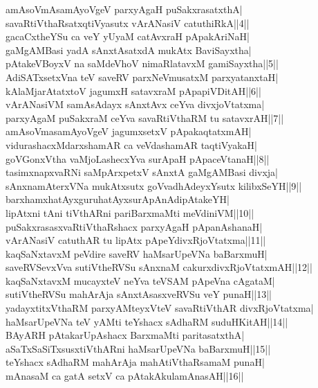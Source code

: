 \documentclass{article}
\begin{document}
amAsoVmAsamAyoVgeV parxyAgaH puSakxrasatxthA|\\
savaRtiVthaRsatxqtiVyasutx vArANasiV catuthiRkA||4||\\
gacaCxtheYSu ca veY yUyaM catAvxraH pApakAriNaH|\\
gaMgAMBasi yadA sAnxtAsatxdA mukAtx BaviSayxtha|\\
pAtakeVBoyxV na saMdeVhoV nimaRlatavxM gamiSayxtha||5||\\
AdiSATxsetxVna teV saveRV parxNeVmusatxM parxyatanxtaH|\\
kAlaMjarAtatxtoV jagumxH satavxraM pApapiVDitAH||6||\\
vArANasiVM samAsAdayx sAnxtAvx ceYva divxjoVtatxma|\\
parxyAgaM puSakxraM ceYva savaRtiVthaRM tu satavxrAH||7||\\
amAsoVmasamAyoVgeV jagumxsetxV pApakaqtatxmAH|\\
vidurashacxMdarxshamAR ca veVdashamAR taqtiVyakaH|\\
goVGonxVtha vaMjoLashecxYva surApaH pApaceVtanaH||8||\\
tasimxnapxvaRNi saMpArxpetxV sAnxtA gaMgAMBasi divxja|\\
sAnxnamAterxVNa mukAtxsutx goVvadhAdeyxYsutx kilibxSeYH||9||\\
barxhamxhatAyxguruhatAyxsurApAnAdipAtakeYH|\\
lipAtxni tAni tiVthARni pariBarxmaMti meVdiniVM||10||\\
puSakxrasasxvaRtiVthaRshacx parxyAgaH pApanAshanaH|\\
vArANasiV catuthAR tu lipAtx pApeYdivxRjoVtatxma||11||\\
kaqSaNxtavxM peVdire saveRV haMsarUpeVNa baBarxmuH|\\
saveRVSevxVva sutiVtheRVSu sAnxnaM cakurxdivxRjoVtatxmAH||12||\\
kaqSaNxtavxM mucayxteV neYva teVSAM pApeVna cAgataM|\\
sutiVtheRVSu mahArAja sAnxtAsasxveRVSu veY punaH||13||\\
yadayxtitxVthaRM parxyAMteyxVteV savaRtiVthAR divxRjoVtatxma|\\
haMsarUpeVNa teV yAMti teYshacx sAdhaRM suduHKitAH||14||\\
BAyARH pAtakarUpAshacx BarxmaMti paritasatxthA|\\
aSaTxSaSiTxsusxtiVthARni haMsarUpeVNa baBarxmuH||15||\\
teYshacx sAdhaRM mahArAja mahAtiVthaRsamaM punaH|\\
mAnasaM ca gatA setxV ca pAtakAkulamAnasAH||16||\\
\end{document}
